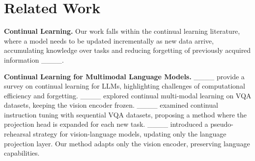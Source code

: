 \section{Related Work}
\label{sec:related_work}


\textbf{Continual Learning.} Our work falls within the continual learning literature, where a model needs to be updated incrementally as new data arrive, accumulating knowledge over tasks and reducing forgetting of previously acquired information ____.

\textbf{Continual Learning for Multimodal Language Models.} ____ provide a survey on continual learning for LLMs, highlighting challenges of computational efficiency and forgetting. ____ explored continual multi-modal learning on VQA datasets, keeping the vision encoder frozen. ____ examined continual instruction tuning with sequential VQA datasets, proposing a method where the projection head is expanded for each new task. ____ introduced a pseudo-rehearsal strategy for vision-language models, updating only the language projection layer. Our method adapts only the vision encoder, preserving language capabilities.

